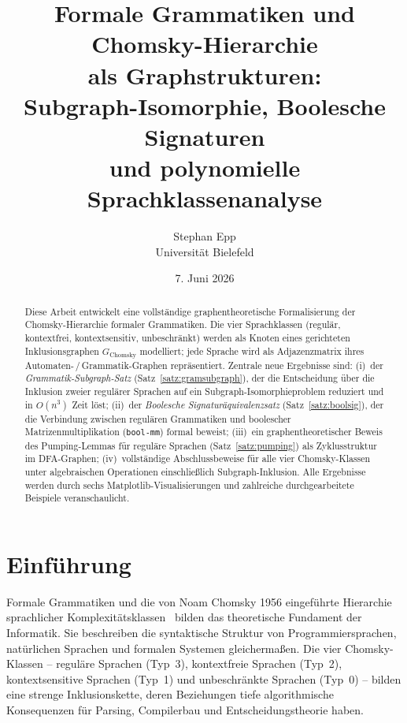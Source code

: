 ﻿\documentclass[a4paper,12pt]{article}
\title{Formale Grammatiken und Chomsky-Hierarchie\\
als Graphstrukturen:\\
Subgraph-Isomorphie, Boolesche Signaturen\\
und polynomielle Sprachklassenanalyse}
\author{Stephan Epp\\[4pt]
\small Universit\"at Bielefeld}
\date{7. Juni 2026}
\theoremstyle{definition}
\begin{document}
\maketitle

\begin{abstract}
Diese Arbeit entwickelt eine vollst\"andige graphentheoretische Formalisierung
der Chomsky-Hierarchie formaler Grammatiken. Die vier Sprachklassen
(regul\"ar, kontextfrei, kontextsensitiv, unbeschr\"ankt) werden als Knoten
eines gerichteten Inklusionsgraphen $G_{\mathrm{Chomsky}}$ modelliert; jede
Sprache wird als Adjazenzmatrix ihres Automaten-\,/\,Grammatik-Graphen repr\"asentiert.
Zentrale neue Ergebnisse sind:
(i)~der \emph{Grammatik-Subgraph-Satz} (Satz~\ref{satz:gramsubgraph}),
der die Entscheidung \"uber die Inklusion zweier regul\"arer Sprachen auf ein
Subgraph-Isomorphieproblem reduziert und in $O(n^3)$ Zeit l\"ost;
(ii)~der \emph{Boolesche Signatur\"aquivalenzsatz} (Satz~\ref{satz:boolsig}),
der die Verbindung zwischen regul\"aren Grammatiken und boolescher Matrizenmultiplikation
(\texttt{bool-mm}) formal beweist;
(iii)~ein graphentheoretischer Beweis des Pumping-Lemmas f\"ur regul\"are Sprachen
(Satz~\ref{satz:pumping}) als Zyklusstruktur im DFA-Graphen;
(iv)~vollst\"andige Abschlussbeweise f\"ur alle vier Chomsky-Klassen unter
algebraischen Operationen einschlie{\ss}lich Subgraph-Inklusion.
Alle Ergebnisse werden durch sechs Matplotlib-Visualisierungen und zahlreiche
durchgearbeitete Beispiele veranschaulicht.
\end{abstract}

\tableofcontents
\newpage

\section{Einf\"uhrung}

Formale Grammatiken und die von Noam Chomsky 1956 eingef\"uhrte Hierarchie
sprachlicher Komplexit\"atsklassen~\cite{chomsky1956} bilden das theoretische
Fundament der Informatik. Sie beschreiben die syntaktische Struktur von
Programmiersprachen, nat\"urlichen Sprachen und formalen Systemen gleicherma{\ss}en.
Die vier Chomsky-Klassen -- regul\"are Sprachen (Typ~3), kontextfreie Sprachen
(Typ~2), kontextsensitive Sprachen (Typ~1) und unbeschr\"ankte Sprachen (Typ~0)
-- bilden eine strenge Inklusionskette, deren Beziehungen tiefe algorithmische
Konsequenzen f\"ur Parsing, Compilerbau und Entscheidungstheorie haben.
\end{document}
